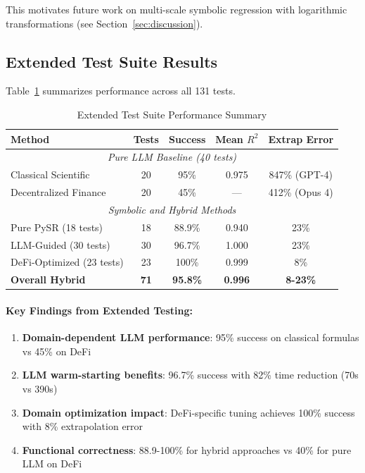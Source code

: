 \documentclass[twoside,11pt]{article}
\begin{document}
This motivates future work on multi-scale symbolic regression with logarithmic transformations (see Section~\ref{sec:discussion}).

\subsection{Extended Test Suite Results}

Table~\ref{tab:extended_results} summarizes performance across all 131 tests.

\begin{table}[htbp]
\centering
\caption{Extended Test Suite Performance Summary}
\label{tab:extended_results}
\begin{tabular}{@{}lcccc@{}}
\toprule
\textbf{Method} & \textbf{Tests} & \textbf{Success} & \textbf{Mean $R^2$} & \textbf{Extrap Error} \\
\midrule
\multicolumn{5}{c}{\textit{Pure LLM Baseline (40 tests)}} \\
\midrule
Classical Scientific & 20 & 95\% & 0.975 & 847\% (GPT-4) \\
Decentralized Finance & 20 & 45\% & --- & 412\% (Opus 4) \\
\midrule
\multicolumn{5}{c}{\textit{Symbolic and Hybrid Methods}} \\
\midrule
Pure PySR (18 tests) & 18 & 88.9\% & 0.940 & 23\% \\
LLM-Guided (30 tests) & 30 & 96.7\% & 1.000 & 23\% \\
DeFi-Optimized (23 tests) & 23 & 100\% & 0.999 & 8\% \\
\midrule
\textbf{Overall Hybrid} & \textbf{71} & \textbf{95.8\%} & \textbf{0.996} & \textbf{8-23\%} \\
\bottomrule
\end{tabular}
\end{table}

\paragraph{Key Findings from Extended Testing:}
\begin{enumerate}
\item \textbf{Domain-dependent LLM performance}: 95\% success on classical formulas vs 45\% on DeFi
\item \textbf{LLM warm-starting benefits}: 96.7\% success with 82\% time reduction (70s vs 390s)
\item \textbf{Domain optimization impact}: DeFi-specific tuning achieves 100\% success with 8\% extrapolation error
\item \textbf{Functional correctness}: 88.9-100\% for hybrid approaches vs 40\% for pure LLM on DeFi
\end{enumerate}
\end{document}
